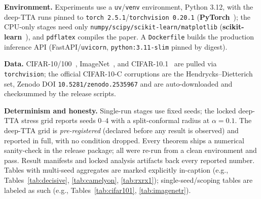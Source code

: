 \documentclass[conference]{IEEEtran}
\theoremstyle{plain}
\theoremstyle{definition}
\begin{document}
\noindent\textbf{Environment.} Experiments use a \texttt{uv}/\texttt{venv} environment, Python
3.12, with the deep-TTA runs pinned to \texttt{torch 2.5.1}/\texttt{torchvision 0.20.1}
(\textbf{PyTorch}~\cite{paszke2019pytorch}); the CPU-only stages need only
\texttt{numpy/scipy/scikit-learn/matplotlib} (\textbf{scikit-learn}~\cite{pedregosa2011sklearn}),
and \texttt{pdflatex}
compiles the paper. A \texttt{Dockerfile} builds the production inference API
(FastAPI/\texttt{uvicorn}, \texttt{python:3.11-slim} pinned by digest).

\noindent\textbf{Data.} CIFAR-10/100~\cite{krizhevsky2009learningmultiple},
ImageNet~\cite{deng2009imagenet}, and CIFAR-10.1~\cite{recht2019cifar10}
are pulled via \texttt{torchvision}; the official CIFAR-10-C
corruptions are the Hendrycks--Dietterich set, Zenodo DOI \texttt{10.5281/zenodo.2535967}
and are auto-downloaded and checksummed by the release scripts.

\noindent\textbf{Determinism and honesty.} Single-run stages use fixed seeds; the locked
deep-TTA stress grid reports seeds $0$--$4$ with a split-conformal radius at
$\alpha=0.1$. The deep-TTA grid is \emph{pre-registered} (declared before any result is
observed) and reported in full, with no condition dropped. Every theorem ships a numerical
sanity-check in the release package; all were re-run
from a clean environment and pass. Result manifests and locked analysis artifacts back every
reported number. Tables with multi-seed aggregates are marked explicitly in-caption
(e.g., Tables~\ref{tab:decisive}, \ref{tab:camelyon}, \ref{tab:rxrx1}); single-seed/scoping tables
are labeled as such (e.g., Tables~\ref{tab:cifar101}, \ref{tab:imagenetr}).
\end{document}
